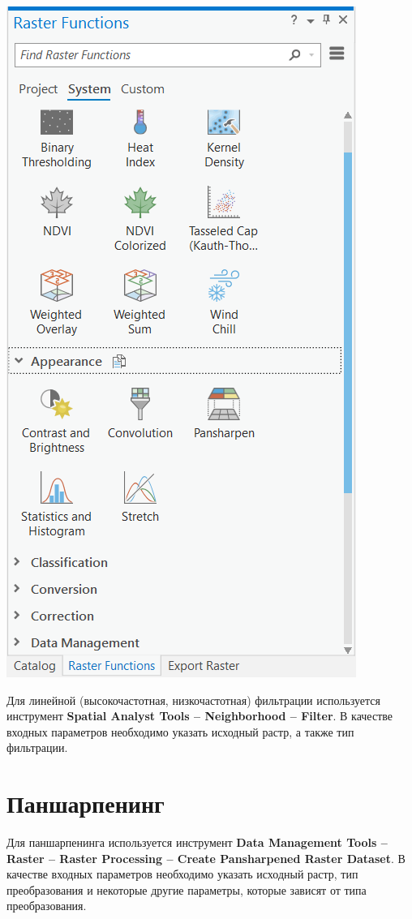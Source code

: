 \documentclass[
  12pt,
]{book}
\begin{document}
\includegraphics{images/Ref01/Raster_functions.png}

Для линейной (высокочастотная, низкочастотная) фильтрации используется инструмент \textbf{Spatial Analyst Tools -- Neighborhood -- Filter}. В качестве входных параметров необходимо указать исходный растр, а также тип фильтрации.

\hypertarget{pansharpen-pansharpen}{%
\section{Паншарпенинг}\label{pansharpen-pansharpen}}

Для паншарпенинга используется инструмент \textbf{Data Management Tools -- Raster -- Raster Processing -- Create Pansharpened Raster Dataset}. В качестве входных параметров необходимо указать исходный растр, тип преобразования и некоторые другие параметры, которые зависят от типа преобразования.
\end{document}
